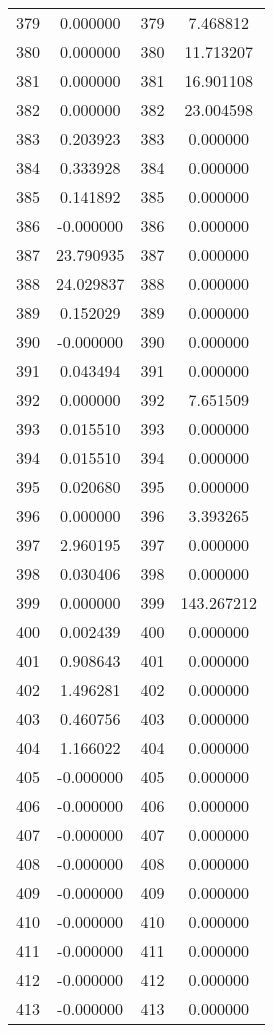 \documentclass[12pt]{article}
\begin{document}
\begin{longtable}{@{}cccc@{}}
379 & 0.000000 & 379 & 7.468812 \\
380 & 0.000000 & 380 & 11.713207 \\
381 & 0.000000 & 381 & 16.901108 \\
382 & 0.000000 & 382 & 23.004598 \\
383 & 0.203923 & 383 & 0.000000 \\
384 & 0.333928 & 384 & 0.000000 \\
385 & 0.141892 & 385 & 0.000000 \\
386 & -0.000000 & 386 & 0.000000 \\
387 & 23.790935 & 387 & 0.000000 \\
388 & 24.029837 & 388 & 0.000000 \\
389 & 0.152029 & 389 & 0.000000 \\
390 & -0.000000 & 390 & 0.000000 \\
391 & 0.043494 & 391 & 0.000000 \\
392 & 0.000000 & 392 & 7.651509 \\
393 & 0.015510 & 393 & 0.000000 \\
394 & 0.015510 & 394 & 0.000000 \\
395 & 0.020680 & 395 & 0.000000 \\
396 & 0.000000 & 396 & 3.393265 \\
397 & 2.960195 & 397 & 0.000000 \\
398 & 0.030406 & 398 & 0.000000 \\
399 & 0.000000 & 399 & 143.267212 \\
400 & 0.002439 & 400 & 0.000000 \\
401 & 0.908643 & 401 & 0.000000 \\
402 & 1.496281 & 402 & 0.000000 \\
403 & 0.460756 & 403 & 0.000000 \\
404 & 1.166022 & 404 & 0.000000 \\
405 & -0.000000 & 405 & 0.000000 \\
406 & -0.000000 & 406 & 0.000000 \\
407 & -0.000000 & 407 & 0.000000 \\
408 & -0.000000 & 408 & 0.000000 \\
409 & -0.000000 & 409 & 0.000000 \\
410 & -0.000000 & 410 & 0.000000 \\
411 & -0.000000 & 411 & 0.000000 \\
412 & -0.000000 & 412 & 0.000000 \\
413 & -0.000000 & 413 & 0.000000 \\

\end{longtable}
\end{document}
